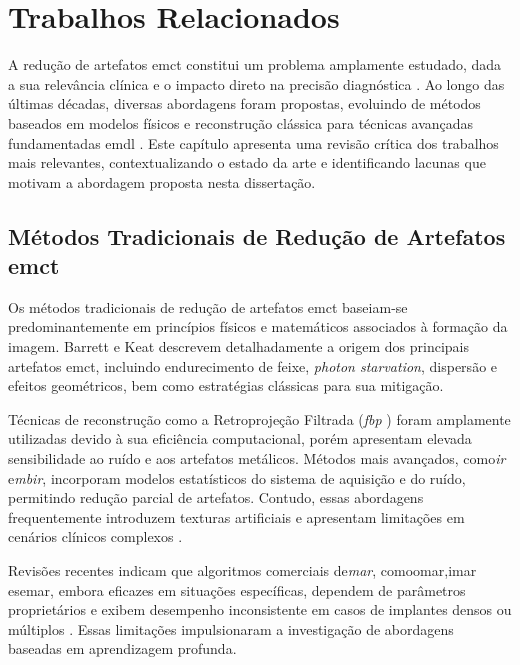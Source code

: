 \chapter{Trabalhos Relacionados}
\label{chap:trabalhos_relacionados}

A redução de artefatos em\acrfull{ct} constitui um problema amplamente estudado, dada a sua relevância clínica e o impacto direto na precisão diagnóstica \cite{kleberAdvancementsSupervisedDeep2024}. Ao longo das últimas décadas, diversas abordagens foram propostas, evoluindo de métodos baseados em modelos físicos e reconstrução clássica para técnicas avançadas fundamentadas em\acrfull{dl} \cite{kleberAdvancementsSupervisedDeep2024}. Este capítulo apresenta uma revisão crítica dos trabalhos mais relevantes, contextualizando o estado da arte e identificando lacunas que motivam a abordagem proposta nesta dissertação.

\section{Métodos Tradicionais de Redução de Artefatos em\acrshort{ct}}
Os métodos tradicionais de redução de artefatos em\acrshort{ct} baseiam-se predominantemente em princípios físicos e matemáticos associados à formação da imagem. Barrett e Keat\cite{barrettArtifactsCTRecognition2004} descrevem detalhadamente a origem dos principais artefatos em\acrshort{ct}, incluindo endurecimento de feixe, \textit{photon starvation}, dispersão e efeitos geométricos, bem como estratégias clássicas para sua mitigação.

Técnicas de reconstrução como a Retroprojeção Filtrada (\textit{\acrshort{fbp}} ) foram amplamente utilizadas devido à sua eficiência computacional, porém apresentam elevada sensibilidade ao ruído e aos artefatos metálicos. Métodos mais avançados, como\textit{\acrfull{ir}} e\textit{\acrfull{mbir}}, incorporam modelos estatísticos do sistema de aquisição e do ruído, permitindo redução parcial de artefatos. Contudo, essas abordagens frequentemente introduzem texturas artificiais e apresentam limitações em cenários clínicos complexos \cite{sahuTransformingCTImaging2025}.

Revisões recentes indicam que algoritmos comerciais de\textit{\acrfull{mar}}, como\acrshort{omar},\acrshort{imar} e\acrshort{semar}, embora eficazes em situações específicas, dependem de parâmetros proprietários e exibem desempenho inconsistente em casos de implantes densos ou múltiplos \cite{kleberAdvancementsSupervisedDeep2024, sellesAdvancesMetalArtifact2024}. Essas limitações impulsionaram a investigação de abordagens baseadas em aprendizagem profunda.

